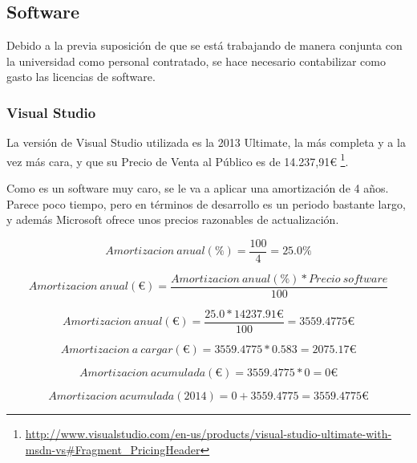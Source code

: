 \subsection{Software}
Debido a la previa suposici\'on de que se est\'a trabajando de manera conjunta con la 
universidad como personal contratado, se hace necesario contabilizar como gasto las licencias de software.

\subsubsection{Visual Studio}
La versi\'on de Visual Studio utilizada es la 2013 Ultimate, la m\'as completa y a la vez m\'as
cara, y que su Precio de Venta al P\'ublico es de 14.237,91€ \footnote{\url{http://www.visualstudio.com/en-us/products/visual-studio-ultimate-with-msdn-vs\#Fragment_PricingHeader}}.

Como es un software muy caro, se le va a aplicar una amortizaci\'on de 4 a\~nos.
Parece poco tiempo, pero en t\'erminos de desarrollo es un periodo bastante largo, y adem\'as
Microsoft ofrece unos precios razonables de actualizaci\'on.

\begin{center}
\begin{equation}
Amortizacion \ anual (\%) = \frac{100}{4} = 25.0 \%
\end{equation}

\begin{equation}
Amortizacion \ anual (€) = \frac{Amortizacion \ anual(\%) * Precio \ software}{100}
\end{equation}

\begin{equation}
Amortizacion \ anual (€) = \frac{25.0 * 14237.91 €}{100} = 3559.4775 €
\end{equation}

\begin{equation}
Amortizacion \ a \ cargar (€) = 3559.4775 * 0.583 = 2075.17 €
\end{equation}

\begin{equation}
Amortizacion \ acumulada (€) = 3559.4775 * 0 = 0 €
\end{equation}

\begin{equation}
Amortizacion \ acumulada (2014) = 0 + 3559.4775 = 3559.4775 €
\end{equation} 
\end{center} 

